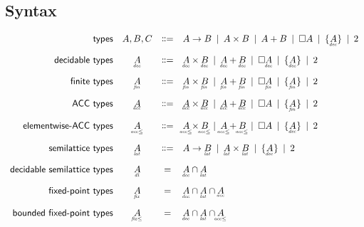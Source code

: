 \documentclass{article}
\begin{document}
\subsection{Syntax}

\[
\begin{array}{rccl}
  \textsf{types} & A,B,C
  &\bnfeq& A \to B \pipe A \x B \pipe A + B
  \pipe \Disc{A} \pipe \Seteq{A} \pipe \tbool
  \vspace{1em}\\

  \textsf{decidable types} & \eq{A}
  &\bnfeq& \eq{A} \x \eq{B} \pipe \eq{A} + \eq{B}
  \pipe \Disc{\eq{A}} \pipe \Seteq{A} \pipe \tbool
  \vspace{1em}\\

  \textsf{finite types} & \fin{A}
  &\bnfeq& \fin{A} \x \fin{B} \pipe \fin{A} + \fin{B}
  \pipe \Disc{\fin{A}} \pipe \Set{\fin{A}} \pipe \tbool
  \vspace{1em}\\

  \textsf{ACC types} & \acc{A}
  &\bnfeq& \acc{A} \x \acc{B} \pipe \acc{A} + \acc{B}
  \pipe \Disc{A} \pipe \Set{\fin{A}} \pipe \tbool
  \vspace{1em}\\

  \textsf{elementwise-ACC types} & \eltacc{A}
  &\bnfeq& \eltacc{A} \x \eltacc{B} \pipe \eltacc{A} + \eltacc{B}
  \pipe \Disc{A} \pipe \Seteq{A} \pipe \tbool
  \vspace{1em}\\

  \textsf{semilattice types} & \lat{A}
  &\bnfeq& A \to \lat{B} \pipe \lat{A} \x \lat{B} \pipe \Seteq{A} \pipe \tbool
  \vspace{1em}\\

  \textsf{decidable semilattice types} & \eqlat{A}
  &=& \eq{A} \cap \lat{A}
  \vspace{1em}\\

  \textsf{fixed-point types} & \fixtype{A}
  &=& \eq{A} \cap \lat{A} \cap \acc{A}
  \vspace{1em}\\

  \textsf{bounded fixed-point types} & \fixletype{A}
  &=& \eq{A} \cap \lat{A} \cap \eltacc{A}
  \vspace{1em}\\


\end{array}\]
\end{document}
